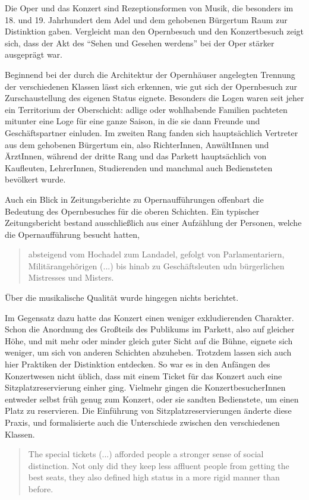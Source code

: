 \documentclass[a4paper, german, oneside]{scrbook}
\begin{document}
Die Oper und das Konzert sind Rezeptionsformen von Musik, die besonders im 18. und 19. Jahrhundert dem Adel und dem gehobenen Bürgertum Raum zur Distinktion gaben. Vergleicht man den Opernbesuch und den Konzertbesuch zeigt sich, dass der Akt des \enquote{Sehen und Gesehen werdens} bei der Oper stärker ausgeprägt war.

Beginnend bei der durch die Architektur der Opernhäuser angelegten Trennung der verschiedenen Klassen lässt sich erkennen, wie gut sich der Opernbesuch zur Zurschaustellung des eigenen Status eignete. Besonders die Logen waren seit jeher ein Territorium der Oberschicht: adlige oder wohlhabende Familien pachteten mitunter eine Loge für eine ganze Saison, in die sie dann Freunde und Geschäftspartner einluden. Im zweiten Rang fanden sich hauptsächlich Vertreter aus dem gehobenen Bürgertum ein, also RichterInnen, AnwältInnen und ÄrztInnen, während der dritte Rang und das Parkett hauptsächlich von Kaufleuten, LehrerInnen, Studierenden und manchmal auch Bediensteten bevölkert wurde. \parencite[vgl.][79]{muller_publikum_2014}

Auch ein Blick in Zeitungsberichte zu Opernaufführungen offenbart die Bedeutung des Opernbesuches für die oberen Schichten. Ein typischer Zeitungsbericht bestand ausschließlich aus einer Aufzählung der Personen, welche die Opernaufführung besucht hatten, \blockquote[{\cite[80]{muller_publikum_2014}}]{absteigend vom Hochadel zum Landadel, gefolgt von Parlamentariern, Militärangehörigen (...) bis hinab zu Geschäftsleuten udn bürgerlichen Mistresses und Misters.} Über die musikalische Qualität wurde hingegen nichts berichtet.

Im Gegensatz dazu hatte das Konzert einen weniger exkludierenden Charakter. Schon die Anordnung des Großteils des Publikums im Parkett, also auf gleicher Höhe, und mit mehr oder minder gleich guter Sicht auf die Bühne, eignete sich weniger, um sich von anderen Schichten abzuheben. Trotzdem lassen sich auch hier Praktiken der Distinktion entdecken. So war es in den Anfängen des Konzertwesen nicht üblich, dass mit einem Ticket für das Konzert auch eine Sitzplatzreservierung einher ging. Vielmehr gingen die KonzertbesucherInnen entweder selbst früh genug zum Konzert, oder sie sandten Bedienstete, um einen Platz zu reservieren. Die Einführung von Sitzplatzreservierungen änderte diese Praxis, und formalisierte auch die Unterschiede zwischen den verschiedenen Klassen. \parencite[30]{weber_music_2004}

\blockquote[{\cite[30]{weber_music_2004}}]{The special tickets (...) afforded people a stronger sense of social distinction.  Not only did they keep less affluent people from getting the best seats, they also defined high status in a more rigid manner than before.}
\end{document}
